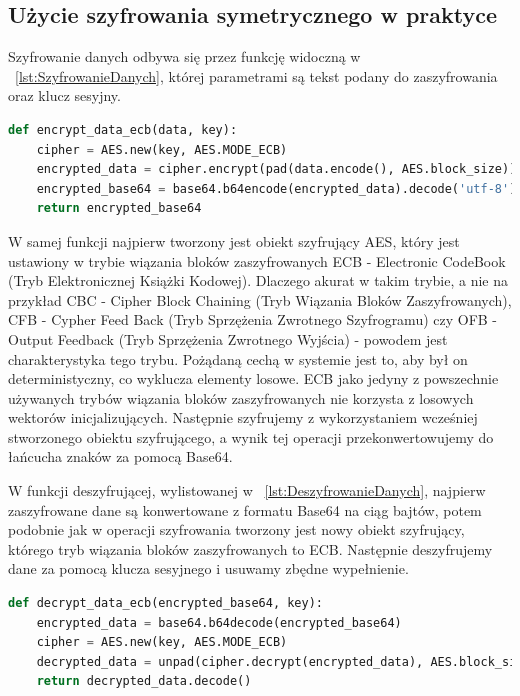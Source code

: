 \subsection{Użycie szyfrowania symetrycznego w praktyce}
\label{ssec:SzyfrowanieSymetryczneUzycie}
Szyfrowanie danych odbywa się przez funkcję widoczną w \lstlistingname{}~\ref{lst:SzyfrowanieDanych}, której parametrami są tekst podany do zaszyfrowania oraz klucz sesyjny. 
\begin{lstlisting}[language=Python, extendedchars=true, caption={Szyfrowanie danych}, label={lst:SzyfrowanieDanych}]
def encrypt_data_ecb(data, key):
    cipher = AES.new(key, AES.MODE_ECB)
    encrypted_data = cipher.encrypt(pad(data.encode(), AES.block_size))
    encrypted_base64 = base64.b64encode(encrypted_data).decode('utf-8')
    return encrypted_base64
\end{lstlisting}
 W samej funkcji najpierw tworzony jest obiekt szyfrujący AES, który jest ustawiony w trybie wiązania bloków zaszyfrowanych ECB - Electronic CodeBook (Tryb Elektronicznej Książki Kodowej). Dlaczego akurat w takim trybie, a nie na przykład CBC - Cipher Block Chaining (Tryb Wiązania Bloków Zaszyfrowanych), CFB - Cypher Feed Back (Tryb Sprzężenia Zwrotnego Szyfrogramu) czy OFB - Output Feedback (Tryb Sprzężenia Zwrotnego Wyjścia) - powodem jest charakterystyka tego trybu. Pożądaną cechą w systemie jest to, aby był on deterministyczny, co wyklucza elementy losowe. ECB jako jedyny z powszechnie używanych trybów wiązania bloków zaszyfrowanych nie korzysta z losowych wektorów inicjalizujących. Następnie szyfrujemy z wykorzystaniem wcześniej stworzonego obiektu szyfrującego, a wynik tej operacji przekonwertowujemy do łańcucha znaków za pomocą Base64.

 W funkcji deszyfrującej, wylistowanej w \lstlistingname{}~\ref{lst:DeszyfrowanieDanych}, najpierw zaszyfrowane dane są konwertowane z formatu Base64 na ciąg bajtów, potem podobnie jak w operacji szyfrowania tworzony jest nowy obiekt szyfrujący, którego tryb wiązania bloków zaszyfrowanych to ECB. Następnie deszyfrujemy dane za pomocą klucza sesyjnego i usuwamy zbędne wypełnienie.

\begin{lstlisting}[language=Python, extendedchars=true, caption={Deszyfrowanie danych}, label={lst:DeszyfrowanieDanych}]
def decrypt_data_ecb(encrypted_base64, key):
    encrypted_data = base64.b64decode(encrypted_base64)
    cipher = AES.new(key, AES.MODE_ECB)
    decrypted_data = unpad(cipher.decrypt(encrypted_data), AES.block_size)
    return decrypted_data.decode()
\end{lstlisting}


